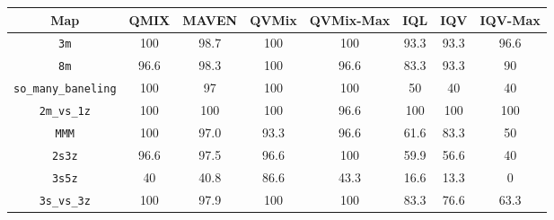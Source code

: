\setlength\tabcolsep{4.5pt}
\begin{tabular}{|c|c|c|c|c|c|c|c|}
        \hline
        
        Map & QMIX & MAVEN &     QVMix & QVMix-Max  & IQL & IQV & IQV-Max\\
        \hline
         \texttt{3m} & \cellcolor{yellow!25}100 & 98.7 &   \cellcolor{green!25}100 & 100 & 93.3 & 93.3& 96.6 \\
        
         \texttt{8m} & 96.6& \cellcolor{yellow!25}98.3 &  \cellcolor{green!25}100 & 96.6 & 83.3& 93.3& 90\\
        
         \texttt{so\_many\_baneling} & \cellcolor{yellow!25}100 & 97  & \cellcolor{green!25}100& 100& 50 & 40 & 40\\
        
        \texttt{2m\_vs\_1z} & \cellcolor{yellow!25}100 & 100 &\cellcolor{green!25}100 & 96.6  & 100 & 100 & 100\\
        \hline
        
       \texttt{MMM} & \cellcolor{green!25}100 & \cellcolor{yellow!25}97.0 & 93.3 & 96.6  & 61.6 & 83.3 & 50 \\
        
        \texttt{2s3z}  & 96.6 & \cellcolor{yellow!25}97.5 &  96.6 & \cellcolor{green!25}100 & 59.9 & 56.6 & 40 \\
        
        \texttt{3s5z} & 40 & 40.8 &\cellcolor{green!25}86.6 & \cellcolor{yellow!25}43.3  & 16.6 & 13.3 & 0 \\
        
        \texttt{3s\_vs\_3z}  & \cellcolor{yellow!25}100 & 97.9  &  \cellcolor{green!25}100 & 100  & 83.3 & 76.6 & 63.3 \\
        \hline
    \end{tabular}
    
        
